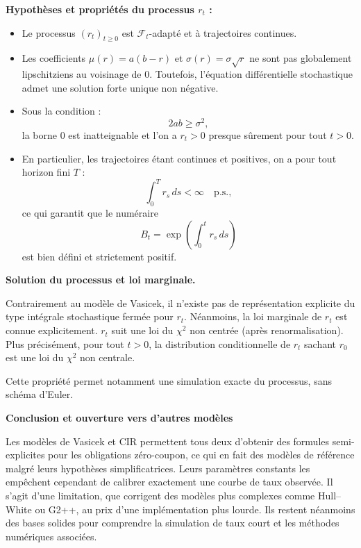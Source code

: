 \textbf{Hypothèses et propriétés du processus $r_t$ :}
\begin{itemize}
    \item Le processus $(r_t)_{t\ge 0}$ est $\mathcal{F}_t$-adapté et à trajectoires continues.
    \item Les coefficients $\mu(r)=a(b-r)$ et $\sigma(r)=\sigma\sqrt{r}$ ne sont pas globalement lipschitziens au voisinage de $0$. Toutefois, l’équation différentielle stochastique admet une solution forte unique non négative.
    \item Sous la condition :
    \begin{equation}
        2ab \ge \sigma^2,
    \end{equation}
    la borne $0$ est inatteignable et l’on a $r_t>0$ presque sûrement pour tout $t>0$.
    \item En particulier, les trajectoires étant continues et positives, on a pour tout horizon fini $T$ :
    \begin{equation}
        \int_0^T r_s\,ds < \infty \quad \text{p.s.},
    \end{equation}
    ce qui garantit que le numéraire
    \[
        B_t=\exp\left(\int_0^t r_s\,ds\right)
    \]
    est bien défini et strictement positif.
\end{itemize}

\medskip

\textbf{Solution du processus et loi marginale.}

Contrairement au modèle de Vasicek, il n’existe pas de représentation explicite du type intégrale stochastique fermée pour $r_t$.  
Néanmoins, la loi marginale de $r_t$ est connue explicitement. $r_t$ suit une loi du $\chi^2$ non centrée (après renormalisation). Plus précisément, pour tout $t>0$, la distribution conditionnelle de $r_t$ sachant $r_0$ est une loi du $\chi^2$ non centrale.

Cette propriété permet notamment une simulation exacte du processus, sans schéma d’Euler.

\medskip

\textbf{Conclusion et ouverture vers d’autres modèles}

Les modèles de Vasicek et CIR permettent tous deux d'obtenir des formules semi-explicites pour les obligations zéro-coupon, ce qui en fait des modèles de référence malgré leurs hypothèses simplificatrices.
Leurs paramètres constants les empêchent cependant de calibrer exactement une courbe de taux observée. Il s'agit d'une limitation, que corrigent des modèles plus complexes comme Hull--White ou G2++, au prix d'une implémentation plus lourde.
Ils restent néanmoins des bases solides pour comprendre la simulation de taux court et les méthodes numériques associées.

